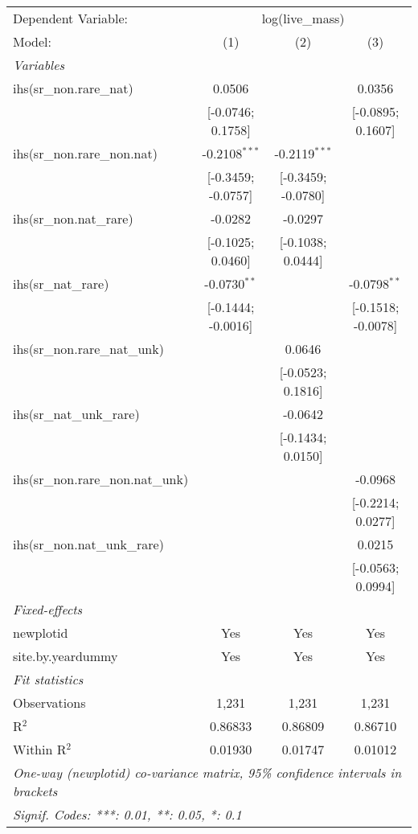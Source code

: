 \begin{tabular}{lccc}
\tabularnewline\midrule\midrule
Dependent Variable:&\multicolumn{3}{c}{log(live\_mass)}\\
Model:&(1) & (2) & (3)\\
\midrule \emph{Variables}&   &   &  \\
ihs(sr\_non.rare\_nat)&0.0506 &    & 0.0356\\
  &[-0.0746; 0.1758] &    & [-0.0895; 0.1607]\\
ihs(sr\_non.rare\_non.nat)&-0.2108$^{***}$ & -0.2119$^{***}$ &   \\
  &[-0.3459; -0.0757] & [-0.3459; -0.0780] &   \\
ihs(sr\_non.nat\_rare)&-0.0282 & -0.0297 &   \\
  &[-0.1025; 0.0460] & [-0.1038; 0.0444] &   \\
ihs(sr\_nat\_rare)&-0.0730$^{**}$ &    & -0.0798$^{**}$\\
  &[-0.1444; -0.0016] &    & [-0.1518; -0.0078]\\
ihs(sr\_non.rare\_nat\_unk)&   & 0.0646 &   \\
  &   & [-0.0523; 0.1816] &   \\
ihs(sr\_nat\_unk\_rare)&   & -0.0642 &   \\
  &   & [-0.1434; 0.0150] &   \\
ihs(sr\_non.rare\_non.nat\_unk)&   &    & -0.0968\\
  &   &    & [-0.2214; 0.0277]\\
ihs(sr\_non.nat\_unk\_rare)&   &    & 0.0215\\
  &   &    & [-0.0563; 0.0994]\\
\midrule \emph{Fixed-effects}&   &   &  \\
newplotid & Yes & Yes & Yes\\
site.by.yeardummy & Yes & Yes & Yes\\
\midrule \emph{Fit statistics}&  & & \\
Observations & 1,231&1,231&1,231\\
R$^2$ & 0.86833&0.86809&0.86710\\
Within R$^2$ & 0.01930&0.01747&0.01012\\
\midrule\midrule\multicolumn{4}{l}{\emph{One-way (newplotid) co-variance matrix, 95\% confidence intervals in brackets}}\\
\multicolumn{4}{l}{\emph{Signif. Codes: ***: 0.01, **: 0.05, *: 0.1}}\\
\end{tabular}


